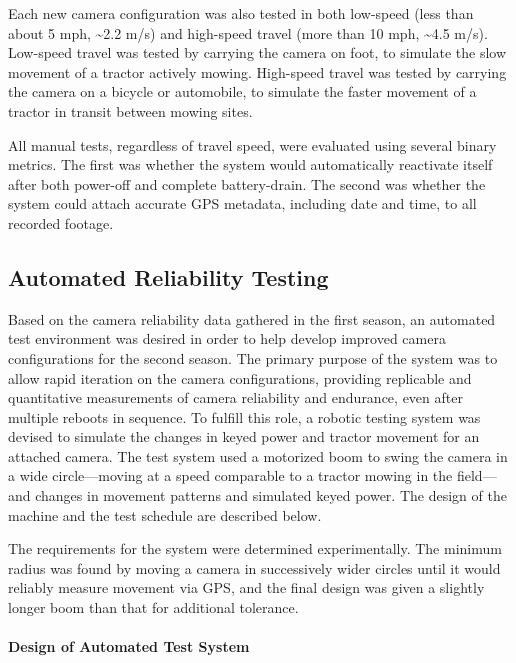 \documentclass[
]{article}
\begin{document}
Each new camera configuration was also tested in both low-speed (less
than about 5 mph, \textasciitilde2.2 m/s) and high-speed travel (more
than 10 mph, \textasciitilde4.5 m/s). Low-speed travel was tested by
carrying the camera on foot, to simulate the slow movement of a tractor
actively mowing. High-speed travel was tested by carrying the camera on
a bicycle or automobile, to simulate the faster movement of a tractor in
transit between mowing sites.

All manual tests, regardless of travel speed, were evaluated using
several binary metrics. The first was whether the system would
automatically reactivate itself after both power-off and complete
battery-drain. The second was whether the system could attach accurate
GPS metadata, including date and time, to all recorded footage.

\subsection{Automated Reliability
Testing}\label{automated-reliability-testing}

Based on the camera reliability data gathered in the first season, an
automated test environment was desired in order to help develop improved
camera configurations for the second season. The primary purpose of the
system was to allow rapid iteration on the camera configurations,
providing replicable and quantitative measurements of camera reliability
and endurance, even after multiple reboots in sequence. To fulfill this
role, a robotic testing system was devised to simulate the changes in
keyed power and tractor movement for an attached camera. The test system
used a motorized boom to swing the camera in a wide circle---moving at a
speed comparable to a tractor mowing in the field---and changes in
movement patterns and simulated keyed power. The design of the machine
and the test schedule are described below.

The requirements for the system were determined experimentally. The
minimum radius was found by moving a camera in successively wider
circles until it would reliably measure movement via GPS, and the final
design was given a slightly longer boom than that for additional
tolerance.

\paragraph{Design of Automated Test
System}\label{design-of-automated-test-system}
\end{document}
